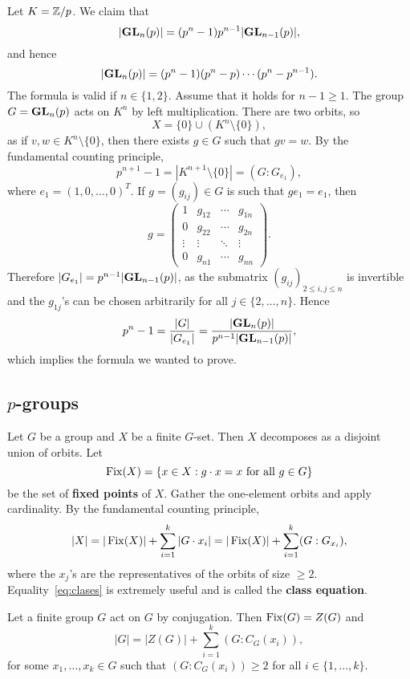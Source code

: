 \begin{example}
Let $K=\mathbb{Z}/p$.
We claim that 
\[
|\mathbf{GL}_n(p)|=(p^n-1)p^{n-1}|\mathbf{GL}_{n-1}(p)|,
\]
and hence 
\[
|\mathbf{GL}_n(p)|=(p^n-1)(p^n-p)\cdots (p^n-p^{n-1}).
\]
The formula is valid if $n\in\{1,2\}$. 
Assume that it holds for $n-1\geq1$.
The group $G=\mathbf{GL}_{n}(p)$ acts on
$K^{n}$ by left multiplication. There are two orbits, so 
\[
X=\{0\}\cup (K^{n}\setminus\{0\}),
\]
as if $v,w\in K^{n}\setminus\{0\}$, then there exists 
$g\in G$ such that $gv=w$.
By the fundamental counting principle,  
\[
p^{n+1}-1=|K^{n+1}\setminus\{0\}|=(G:G_{e_1}),
\]
where $e_1=(1,0,\dots,0)^T$. If $g=(g_{ij})\in G$ is such that
$ge_1=e_1$, then 
\[
g=
\begin{pmatrix}
1 & g_{12} & \cdots & g_{1n}\\
0 & g_{22} & \cdots & g_{2n}\\
\vdots & \vdots & \ddots &\vdots\\
0 & g_{n1} & \cdots & g_{nn}
\end{pmatrix}.
\]
Therefore $|G_{e_1}|=p^{n-1}|\mathbf{GL}_{n-1}(p)|$, as the submatrix 
$(g_{ij})_{2\leq i,j\leq n}$ is invertible and the 
$g_{1j}$'s can be chosen 
arbitrarily for all $j\in\{2,\dots,n\}$.
Hence 
\[
p^{n}-1=\frac{|G|}{|G_{e_1}|}=\frac{|\mathbf{GL}_n(p)|}{p^{n-1}|\mathbf{GL}_{n-1}(p)|},
\]
which implies the formula we wanted to prove.
\end{example}




\subsection{$p$-groups}

Let $G$ be a group and
$X$ be a finite $G$-set. Then $X$ decomposes as a disjoint 
union of orbits. Let 
\[
\operatorname{Fix}(X)=\{x\in X:g\cdot x=x\text{ for all $g\in G$}\}
\]
be the set of \textbf{fixed points} of $X$. Gather  
the one-element orbits and apply cardinality. By the 
fundamental counting principle, 
\begin{equation}
\label{eq:clases}
|X|=|\operatorname{Fix}(X)|+\sum_{i=1}^k|G\cdot x_i|
=|\operatorname{Fix}(X)|+\sum_{i=1}^k(G:G_{x_i}),
\end{equation}
where the $x_j$'s are the representatives
of the orbits of size $\geq2$. Equality~\eqref{eq:clases} is extremely 
useful and is called the 
\textbf{class equation}.

\begin{example}
Let a finite group $G$ act on $G$ by conjugation. 
Then $\operatorname{Fix}(G)=Z(G)$ and 
\[
|G|=|Z(G)|+\sum_{i=1}^k(G:C_G(x_i)),
\]
for some $x_1,\dots,x_k\in G$ such that 
$(G:C_G(x_i))\geq2$ for all $i\in\{1,\dots,k\}$.
\end{example}

